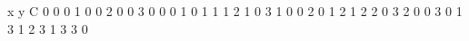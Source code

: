 x y C
0 0 0
1 0 0
2 0 0
3 0 0
0 1 0
1 1 1
2 1 0
3 1 0
0 2 0
1 2 1
2 2 0
3 2 0
0 3 0
1 3 1
2 3 1
3 3 0
